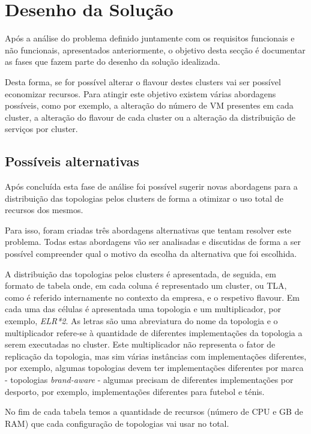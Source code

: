 \chapter{Desenho da Solução}
\label{sec:4-Design}

Após a análise do problema definido juntamente com os requisitos funcionais e não funcionais,
apresentados anteriormente, o objetivo desta secção é documentar as fases que fazem parte do
desenho da solução idealizada.

Desta forma, se for possível alterar o \gls{flavour} destes \glspl{cluster} vai ser possível economizar
recursos. Para atingir este objetivo existem várias abordagens possíveis, como por exemplo, a
alteração do número de \ac{VM} presentes em cada \gls{cluster}, a alteração do \gls{flavour}
de cada \gls{cluster} ou a alteração da distribuição de serviços por \gls{cluster}.

\section{Possíveis alternativas}

Após concluída esta fase de análise foi possível sugerir novas abordagens para a distribuição
das topologias pelos \glspl{cluster} de forma a otimizar o uso total de recursos dos mesmos.

Para isso, foram criadas três abordagens alternativas que tentam resolver este problema. Todas estas
abordagens vão ser analisadas e discutidas de forma a ser possível compreender qual o motivo da
escolha da alternativa que foi escolhida.

A distribuição das topologias pelos \glspl{cluster} é apresentada, de seguida, em formato de 
tabela onde, em cada coluna é representado um \gls{cluster}, ou \ac{TLA}, como é referido 
internamente no contexto da empresa, e o respetivo \gls{flavour}. Em cada uma das células é
apresentada uma topologia e um multiplicador, por exemplo, \textit{ELR*2}. As letras são uma 
abreviatura do nome da topologia e o multiplicador refere-se à quantidade de diferentes
implementações da topologia a serem executadas no \gls{cluster}. Este multiplicador não representa
o fator de replicação da topologia, mas sim várias instâncias com implementações diferentes, por
exemplo, algumas topologias devem ter implementações diferentes por marca - topologias
\textit{brand-aware} - algumas precisam de diferentes implementações por desporto, por exemplo,
implementações diferentes para futebol e ténis.

No fim de cada tabela temos a quantidade de recursos (número de \ac{CPU} e GB de RAM) que cada 
configuração de topologias vai usar no total.

